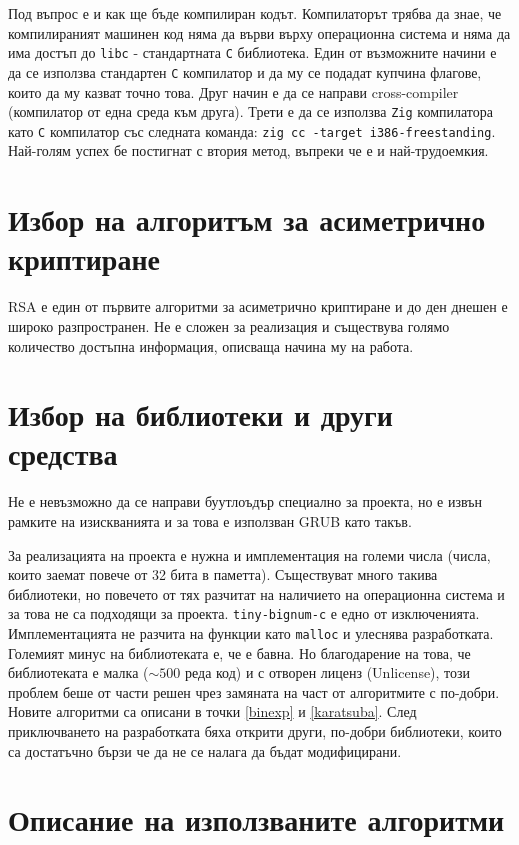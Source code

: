 Под въпрос е и как ще бъде компилиран кодът. Компилаторът трябва да знае, че компилираният машинен код няма да върви върху операционна система и няма да има достъп до {\tt libc} - стандартната {\tt C} библиотека. Един от възможните начини е да се използва стандартен {\tt C} компилатор и да му се подадат купчина флагове, които да му казват точно това. Друг начин е да се направи cross-compiler (компилатор от една среда към друга). Трети е да се използва {\tt Zig} компилатора като {\tt C} компилатор със следната команда:
{\tt zig cc -target i386-freestanding}.
Най-голям успех бе постигнат с втория метод, въпреки че е и най-трудоемкия.

\section{Избор на алгоритъм за асиметрично криптиране}
RSA е един от първите алгоритми за асиметрично криптиране и до ден днешен е широко разпространен. Не е сложен за реализация и съществува голямо количество достъпна информация, описваща начина му на работа.\cite{artoftheproblemrsa, rsapaper}

\section{Избор на библиотеки и други средства}
Не е невъзможно да се направи буутлоъдър специално за проекта, но е извън рамките на изискванията и за това е използван GRUB като такъв.

За реализацията на проекта е нужна и имплементация на големи числа (числа, които заемат повече от 32 бита в паметта). Съществуват много такива библиотеки, но повечето от тях разчитат на наличието на операционна система и за това не са подходящи за проекта. {\tt tiny-bignum-c}\cite{tinybignumc} е едно от изключенията. Имплементацията не разчита на функции като {\tt malloc} и улеснява разработката. Големият минус на библиотеката е, че е бавна. Но благодарение на това, че библиотеката е малка ($\sim 500$ реда код) и с отворен лиценз (Unlicense), този проблем беше от части решен чрез замяната на част от алгоритмите с по-добри. Новите алгоритми са описани в точки \ref{binexp} и \ref{karatsuba}. След приключването на разработката бяха открити други, по-добри библиотеки\cite{tomsfastmath, bignum-embedded}, които са достатъчно бързи че да не се налага да бъдат модифицирани.

\section{Описание на използваните алгоритми} \label{algos}
